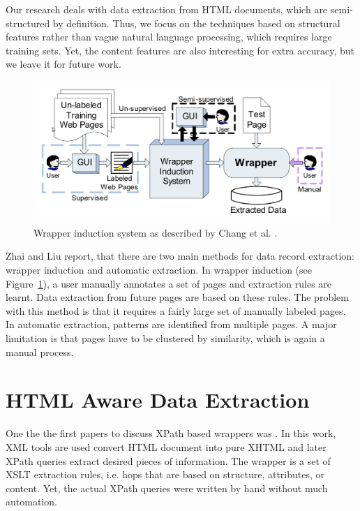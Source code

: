 Our research deals with data extraction from HTML documents, which are semi-structured by definition. Thus, we focus on the techniques based on structural features rather than vague natural language processing, which requires large training sets. Yet, the content features are also interesting for extra accuracy, but we leave it for future work.

\begin{figure}[h]
	\centering
	\includegraphics[width=1.0\textwidth]{figures/wrapper-induction}
	\caption{Wrapper induction system as described by Chang et al. \cite{Chang:2006:SWI:1159162.1159300}.}
	\label{fig:wrapper-induction}
\end{figure}

Zhai and Liu \cite{zhai2005a} report, that there are two main methods for data record extraction: wrapper induction and automatic extraction. In wrapper induction (see Figure~\ref{fig:wrapper-induction}), a user manually annotates a set of pages and extraction rules are learnt. Data extraction from future pages are based on these rules. The problem with this method is that it requires a fairly large set of manually labeled pages. In automatic extraction, patterns are identified from multiple pages. A major limitation is that pages have to be clustered by similarity, which is again a manual process.


\section{HTML Aware Data Extraction}
\label{sec:html-aware-data-extraction}

One the the first papers to discuss XPath based wrappers was \cite{Myllymaki02robustweb}. In this work, XML tools are used convert HTML document into pure XHTML and later XPath queries extract desired pieces of information. The wrapper is a set of XSLT extraction rules, i.e. hops that are based on structure, attributes, or content. Yet, the actual XPath queries were written by hand without much automation.


